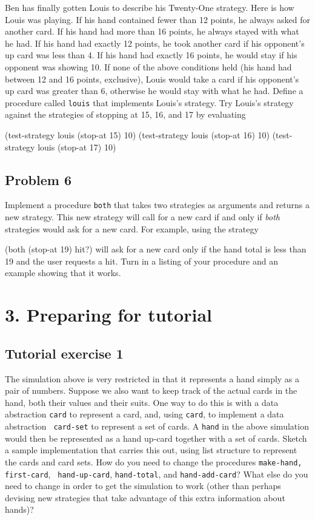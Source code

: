 Ben has finally gotten Louis to describe his Twenty-One strategy.
Here is how Louis was playing.  If his hand contained fewer than 12
points, he always asked for another card.  If his hand had more than
16 points, he always stayed with what he had.  If his hand had exactly
12 points, he took another card if his opponent's up card was less
than 4.  If his hand had exactly 16 points, he would stay if his
opponent was showing 10.  If none of the above conditions held (his
hand had between 12 and 16 points, exclusive), Louis would take a card
if his opponent's up card was greater than 6, otherwise he would stay
with what he had.  Define a procedure called {\tt louis} that
implements Louis's strategy.  Try Louis's strategy against the
strategies of stopping at 15, 16, and 17 by evaluating

\beginlisp
(test-strategy louis (stop-at 15) 10)
(test-strategy louis (stop-at 16) 10)
(test-strategy louis (stop-at 17) 10)
\endlisp

\subsection{Problem 6}

Implement a procedure {\tt both} that takes two strategies as
arguments and returns a new strategy.  This new strategy will call for
a new card if and only if {\em both} strategies would ask for a new
card.  For example, using the strategy

\beginlisp
(both (stop-at 19) hit?)
\endlisp
 will ask for a new card only if the hand total is less than 19 and
the user requests a hit.  Turn in a listing of your procedure and an
example showing that it works.


\section{3. Preparing for tutorial}

\subsection{Tutorial exercise 1}

The simulation above is very restricted in that it represents a hand
simply as a pair of numbers.  Suppose we also want to keep track of
the actual cards in the hand, both their values and their suits.  One
way to do this is with a data abstraction {\tt card} to represent a
card, and, using {\tt card}, to implement a data abstraction {\tt
card-set} to represent a set of cards.  A {\tt hand} in the above
simulation would then be represented as a hand up-card together with a
set of cards.  Sketch a sample implementation that carries this out,
using list structure to represent the cards and card sets.  How do you
need to change the procedures {\tt make-hand, first-card}, {\tt
hand-up-card}, {\tt hand-total}, and {\tt hand-add-card}?  What else
do you need to change in order to get the simulation to work (other
than perhaps devising new strategies that take advantage of this extra
information about hands)?

